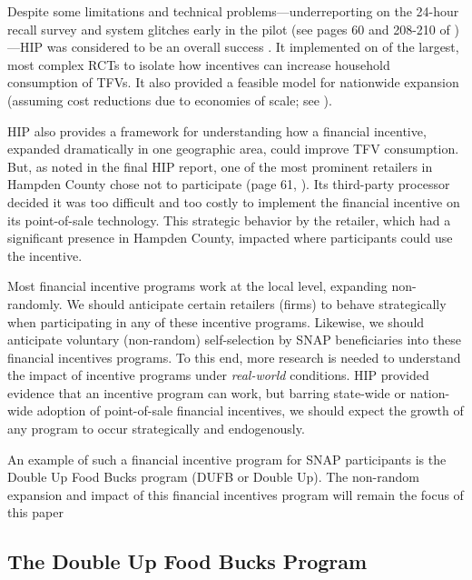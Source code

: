 \documentclass[12pt,letterpaperpaper,]{book}
\begin{document}
Despite some limitations and technical problems---underreporting on the
24-hour recall survey and system glitches early in the pilot (see pages
60 and 208-210 of \citet{bartlett_evaluation_2014})---HIP was considered
to be an overall success
\citep{klerman_short-run_2014, olsho_financial_2016}. It implemented on
of the largest, most complex RCTs to isolate how incentives can increase
household consumption of TFVs. It also provided a feasible model for
nationwide expansion (assuming cost reductions due to economies of
scale; see \citet{an_nationwide_2015}).

HIP also provides a framework for understanding how a financial
incentive, expanded dramatically in one geographic area, could improve
TFV consumption. But, as noted in the final HIP report, one of the most
prominent retailers in Hampden County chose not to participate (page 61,
\citet{bartlett_evaluation_2014}). Its third-party processor decided it
was too difficult and too costly to implement the financial incentive on
its point-of-sale technology. This strategic behavior by the retailer,
which had a significant presence in Hampden County, impacted where
participants could use the incentive.

Most financial incentive programs work at the local level, expanding
non-randomly. We should anticipate certain retailers (firms) to behave
strategically when participating in any of these incentive programs.
Likewise, we should anticipate voluntary (non-random) self-selection by
SNAP beneficiaries into these financial incentives programs. To this
end, more research is needed to understand the impact of incentive
programs under \emph{real-world} conditions. HIP provided evidence that
an incentive program can work, but barring state-wide or nation-wide
adoption of point-of-sale financial incentives, we should expect the
growth of any program to occur strategically and endogenously.

An example of such a financial incentive program for SNAP participants
is the Double Up Food Bucks program (DUFB or Double Up). The non-random
expansion and impact of this financial incentives program will remain
the focus of this paper

\subsection*{The Double Up Food Bucks
Program}\label{the-double-up-food-bucks-program}
\end{document}
